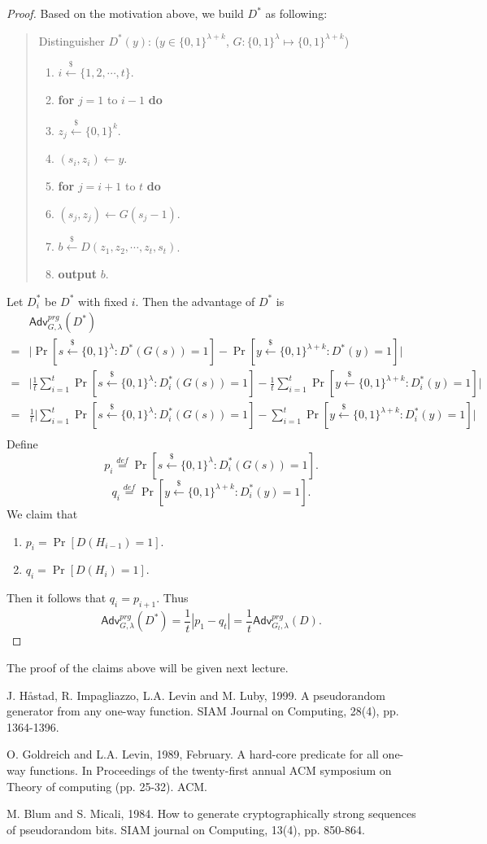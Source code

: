 \documentclass[12pt]{article}
\newcommand{\eqdef}{\stackrel{def}{=}}
\newcommand{\bits}{\{0,1\}}
\newcommand{\getsr}{\stackrel{\$}{\gets}}
\newcommand{\Adv}{\mathsf{Adv}}
\newcommand{\tab}{\hspace{0.3in}}
\theoremstyle{definition}
\begin{document}
\begin{proof}
Based on the motivation above, we build $D^*$ as following:
\begin{quote}
Distinguisher $D^* (y)$: ($y \in \bits^{\lambda+k}$, $G : \bits^\lambda \mapsto \bits^{\lambda+k}$)
\begin{enumerate}
\item $i \getsr \{1, 2, \cdots, t\}$.
\item {\bf for} $j=1$ to $i-1$ {\bf do}
\item \tab $z_j \getsr \bits^k$.
\item $(s_i, z_i) \gets y$.
\item {\bf for} $j=i+1$ to $t$ {\bf do}
\item \tab $(s_j, z_j) \gets G(s_j-1)$.
\item $b \getsr D(z_1, z_2, \cdots, z_t, s_t)$.
\item {\bf output} $b$.
\end{enumerate}
\end{quote}
Let $D_i^*$ be $D^*$ with fixed $i$. Then the advantage of $D^*$ is
$$\begin{aligned}
&\Adv_{G,\lambda}^{prg}(D^*) \\
=& \bigg| \Pr[s \getsr \bits^\lambda : D^*(G(s)) = 1] - \Pr[y \getsr \bits^{\lambda+k} : D^*(y) = 1] \bigg| \\
=& \bigg| \frac{1}{t}\sum_{i=1}^t \Pr[s \getsr \bits^\lambda : D_i^*(G(s)) = 1] - \frac{1}{t}\sum_{i=1}^t \Pr[y \getsr \bits^{\lambda+k} : D_i^*(y) = 1] \bigg| \\
=& \frac{1}{t}\bigg| \sum_{i=1}^t \Pr[s \getsr \bits^\lambda : D_i^*(G(s)) = 1] - \sum_{i=1}^t \Pr[y \getsr \bits^{\lambda+k} : D_i^*(y) = 1] \bigg| \\
\end{aligned}$$
Define
$$p_i \eqdef \Pr[s \getsr \bits^\lambda : D_i^*(G(s)) = 1].$$
$$q_i \eqdef \Pr[y \getsr \bits^{\lambda+k} : D_i^*(y) = 1].$$
We claim that
\begin{enumerate}
\item $p_i = \Pr[D(H_{i-1}) = 1]$.
\item $q_i = \Pr[D(H_i) = 1]$.
\end{enumerate}
Then it follows that $q_i = p_{i+1}$. Thus
$$\Adv_{G,\lambda}^{prg}(D^*) = \frac{1}{t}|p_1 - q_t| = \frac{1}{t} \Adv_{G_t, \lambda}^{prg}(D).$$
\end{proof}
The proof of the claims above will be given next lecture.

\begin{thebibliography}{10}
J. H\aa stad, R. Impagliazzo, L.A. Levin and M. Luby, 1999. 
A pseudorandom generator from any one-way function. 
SIAM Journal on Computing, 28(4), pp. 1364-1396.
	
O. Goldreich and L.A. Levin, 1989, February. 
A hard-core predicate for all one-way functions. 
In Proceedings of the twenty-first annual ACM symposium on Theory of computing (pp. 25-32). ACM.

M. Blum and S. Micali, 1984. 
How to generate cryptographically strong sequences of pseudorandom bits. 
SIAM journal on Computing, 13(4), pp. 850-864.
\end{thebibliography}
\end{document}
